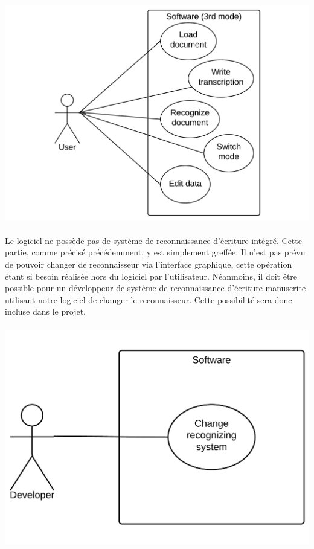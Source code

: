 \newpage

\begin{mdframed}[frametitle={Figure 4 : Diagramme de cas d'utilisation (mode production)}, innerbottommargin=10]
\begin{center}
\includegraphics[scale=0.4]{Usecase_3.pdf}
\end{center}
\end{mdframed}

\paragraph{}
Le logiciel ne possède pas de système de reconnaissance d’écriture intégré.
Cette partie, comme précisé précédemment, y est simplement greffée. Il n’est
pas prévu de pouvoir changer de reconnaisseur via l’interface graphique, cette
opération étant si besoin réalisée hors du logiciel par l'utilisateur.
Néanmoins, il doit être possible pour un développeur de système de
reconnaissance d’écriture manuscrite utilisant notre logiciel de changer le
reconnaisseur. Cette possibilité sera donc incluse dans le projet.

\paragraph{}
\begin{mdframed}[frametitle={Figure 5 : Diagramme de cas d'utilisation (pour développeur)}, innerbottommargin=10]
\begin{center}
\includegraphics[scale=0.4]{Usecase_Dev.pdf}
\end{center}
\end{mdframed}
